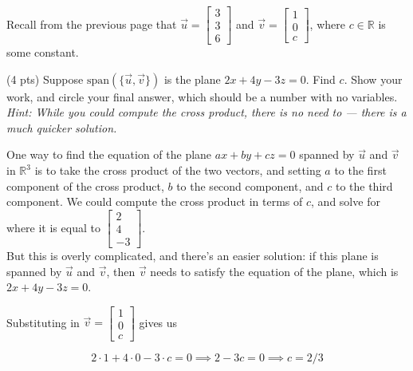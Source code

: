 \documentclass[11pt]{article}
\begin{document}
\begin{prob}
\begin{subprob}
\begin{solution}
\end{solution}

\end{subprob}

\newpage

Recall from the previous page that $\vec u = \begin{bmatrix} 3 \\ 3 \\ 6 \end{bmatrix}$ and $\vec v = \begin{bmatrix} 1 \\ 0 \\ c \end{bmatrix}$, where $c \in \mathbb{R}$ is some constant.

\begin{subprob}(4 pts) Suppose $\text{span}(\{\vec u, \vec v\})$ is the plane $2x + 4y - 3z = 0$. Find $c$. Show your work, and $\boxed{\text{circle}}$ your final answer, which should be a number with no variables. \textit{Hint: While you could compute the cross product, there is no need to --- there is a much quicker solution.}

\emptybox{5cm}

\begin{solution}
One way to find the equation of the plane $ax + by + cz = 0$ spanned by $\vec u$ and $\vec v$ in $\mathbb{R}^3$ is to take the cross product of the two vectors, and setting $a$ to the first component of the cross product, $b$ to the second component, and $c$ to the third component. We could compute the cross product in terms of $c$, and solve for where it is equal to $\begin{bmatrix} 2 \\ 4 \\ -3 \end{bmatrix}$. \\

But this is overly complicated, and there's an easier solution: if this plane is spanned by $\vec u$ and $\vec v$, then $\vec v$ needs to satisfy the equation of the plane, which is $2x + 4y - 3z = 0$.

Substituting in $\vec v = \begin{bmatrix} 1 \\ 0 \\ c \end{bmatrix}$ gives us

$$2 \cdot 1 + 4 \cdot 0 - 3 \cdot c = 0 \implies 2 - 3c = 0 \implies \boxed{c = 2/3}$$

\end{solution}
\end{subprob}

\end{prob}
\end{document}
